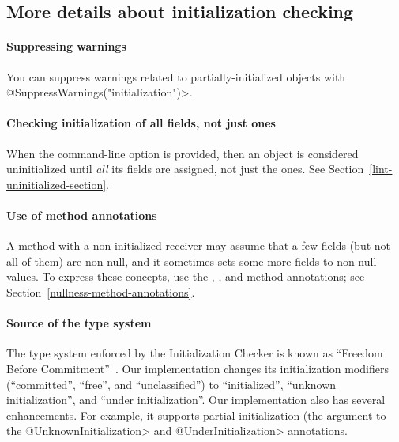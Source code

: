 \subsection{More details about initialization checking\label{initialization-checking}}


\paragraph{Suppressing warnings}

\begin{sloppypar}
You can suppress warnings related to partially-initialized objects with
\<@SuppressWarnings("initialization")>.
\end{sloppypar}

\paragraph{Checking initialization of all fields, not just  ones}

When the  command-line option is provided, then
an object is considered uninitialized until \emph{all} its fields are assigned, not
just the  ones.  See Section~\ref{lint-uninitialized-section}.


\paragraph{Use of method annotations}

A method with a non-initialized receiver may assume that a few fields (but not all
of them) are non-null, and it sometimes sets some more fields to non-null
values.  To express these concepts, use the
,
, and
 method annotations;
see Section~\ref{nullness-method-annotations}.


\paragraph{Source of the type system}

The type system enforced by the Initialization Checker is known as
``Freedom Before Commitment''~\cite{SummersM2011}.  Our implementation
changes its initialization modifiers (``committed'', ``free'', and
``unclassified'') to ``initialized'', ``unknown initialization'', and
``under initialization''.  Our implementation also has several
enhancements.  For example, it supports partial initialization (the
argument to the \<@UnknownInitialization> and \<@UnderInitialization>
annotations.



